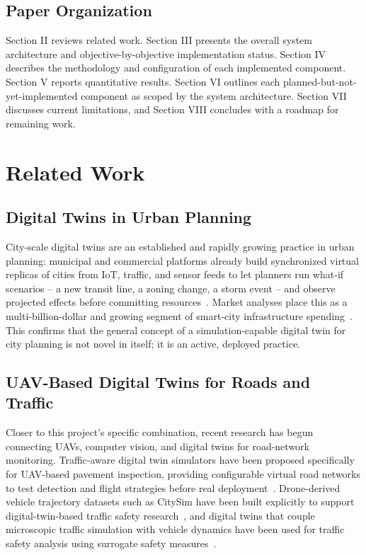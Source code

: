 \documentclass[conference]{IEEEtran}
\begin{document}
\subsection{Paper Organization}

Section II reviews related work. Section III presents the overall system architecture and objective-by-objective implementation status. Section IV describes the methodology and configuration of each implemented component. Section V reports quantitative results. Section VI outlines each planned-but-not-yet-implemented component as scoped by the system architecture. Section VII discusses current limitations, and Section VIII concludes with a roadmap for remaining work.

\section{Related Work}

\subsection{Digital Twins in Urban Planning}

City-scale digital twins are an established and rapidly growing practice in urban planning: municipal and commercial platforms already build synchronized virtual replicas of cities from IoT, traffic, and sensor feeds to let planners run what-if scenarios -- a new transit line, a zoning change, a storm event -- and observe projected effects before committing resources~\cite{gravel2gavel,cityplanner}. Market analyses place this as a multi-billion-dollar and growing segment of smart-city infrastructure spending~\cite{kgt2026}. This confirms that the general concept of a simulation-capable digital twin for city planning is not novel in itself; it is an active, deployed practice.

\subsection{UAV-Based Digital Twins for Roads and Traffic}

Closer to this project's specific combination, recent research has begun connecting UAVs, computer vision, and digital twins for road-network monitoring. Traffic-aware digital twin simulators have been proposed specifically for UAV-based pavement inspection, providing configurable virtual road networks to test detection and flight strategies before real deployment~\cite{uavpavement}. Drone-derived vehicle trajectory datasets such as CitySim have been built explicitly to support digital-twin-based traffic safety research~\cite{citysim}, and digital twins that couple microscopic traffic simulation with vehicle dynamics have been used for traffic safety analysis using surrogate safety measures~\cite{trafficsafetytwin}.
\end{document}
